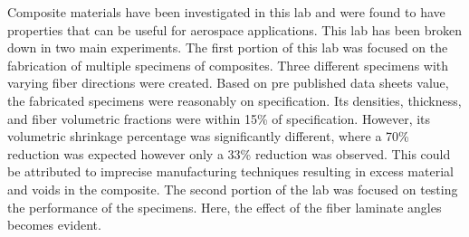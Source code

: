 Composite materials have been investigated in this lab and were found to have properties that can be useful for aerospace applications. This lab has been broken down in two main experiments. The first portion of this lab was focused on the fabrication of multiple specimens of composites. Three different specimens with varying fiber directions were created. Based on pre published data sheets value, the fabricated specimens were reasonably on specification. Its densities, thickness, and fiber volumetric fractions were within 15\% of specification. However, its volumetric shrinkage percentage was significantly different, where a 70\% reduction was expected however only a 33\% reduction was observed. This could be attributed to imprecise manufacturing techniques resulting in excess material and voids in the composite. The second portion of the lab was focused on testing the performance of the specimens. Here, the effect of the fiber laminate angles becomes evident. 